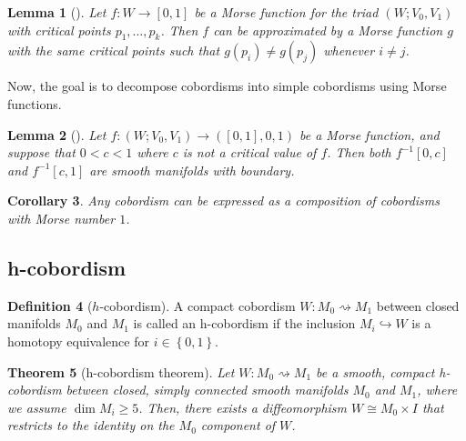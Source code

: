 \documentclass[reqno]{amsart}
\newtheorem{theorem}{Theorem}[section]
\newtheorem{lemma}[theorem]{Lemma}
\newtheorem{corollary}[theorem]{Corollary}
\theoremstyle{definition}
\newtheorem{definition}[theorem]{Definition}
\theoremstyle{remark}
\begin{document}
   \begin{lemma}[]
       Let $f \colon W \to \left[ 0,1 \right] $ be a Morse
       function for the triad $\left( W;
       V_0,V_1\right) $ with critical points $p_1,\ldots,p_k$.
       Then $f$ can be approximated by a Morse function $g$ 
       with the same critical points such that
       $g\left( p_i \right)  \neq g\left( p_j \right) $ whenever
       $i \neq j$.
   \end{lemma}



   Now, the goal is to decompose cobordisms into
   simple cobordisms using Morse functions.

   \begin{lemma}[]
       Let $f \colon \left( W; V_0, V_1 \right) 
       \to \left( \left[ 0,1 \right] , 0, 1 \right) $ be
       a Morse function, and suppose that
       $0 < c < 1$ where $c $ is not a critical value of
       $f$. Then both
       $f^{-1}\left[ 0,c \right] $ and
       $f^{-1}\left[ c,1 \right] $ are smooth
       manifolds with boundary.
   \end{lemma}


   \begin{corollary}
       Any cobordism can be expressed as a composition
       of cobordisms with Morse number $1$.
   \end{corollary}




   \subsection{h-cobordism}
   
   \begin{definition}[$h$-cobordism]
       A compact cobordism $W \colon
       M_0 \rightsquigarrow M_1 $ between closed
       manifolds $M_0$ and $M_1$ is called an
       h-cobordism if the inclusion
       $M_i \hookrightarrow W$ is a homotopy
       equivalence for $i \in \left\{ 0,1 \right\} $.
   \end{definition}


   \begin{theorem}[h-cobordism theorem]
       Let $W \colon
       M_0 \rightsquigarrow M_1$ be a smooth,
       compact h-cobordism between closed, simply
       connected smooth manifolds  $M_0$ and
       $M_1$, where we assume
       $\dim M_i \ge 5$. Then, there
       exists a diffeomorphism
       $W \cong M_0 \times I$ that restricts to the
       identity on the $M_0$ component
       of $W$.
   \end{theorem}
\end{document}
